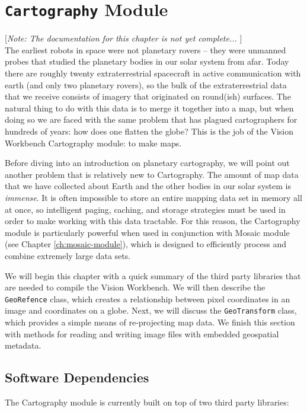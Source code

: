 \chapter{{\tt Cartography} Module}\label{ch:cartography-module}

[{\em Note: The documentation for this chapter is not yet complete... }]
$$
$$ 
The earliest robots in space were not planetary rovers -- they were
unmanned probes that studied the planetary bodies in our solar system
from afar.  Today there are roughly twenty extraterrestrial spacecraft
in active communication with earth (and only two planetary rovers), so
the bulk of the extraterrestrial data that we receive consists of
imagery that originated on round(ish) surfaces.  The natural thing to
do with this data is to merge it together into a map, but when doing
so we are faced with the same problem that has plagued cartographers
for hundreds of years: how does one flatten the globe?  This is the job
of the Vision Workbench Cartography module: to make maps.

Before diving into an introduction on planetary cartography, we will
point out another problem that is relatively new to Cartography.  The
amount of map data that we have collected about Earth and the other
bodies in our solar system is {\em immense}.  It is often impossible
to store an entire mapping data set in memory all at once, so
intelligent paging, caching, and storage strategies must be used in
order to make working with this data tractable.  For this reason, the
Cartography module is particularly powerful when used in conjunction
with Mosaic module (see Chapter \ref{ch:mosaic-module}), which is
designed to efficiently process and combine extremely large data sets.

We will begin this chapter with a quick summary of the third party
libraries that are needed to compile the Vision Workbench.  We will
then describe the \verb#GeoRefence# class, which creates a
relationship between pixel coordinates in an image and coordinates on
a globe.  Next, we will discuss the \verb#GeoTransform# class, which
provides a simple means of re-projecting map data.  We finish this
section with methods for reading and writing image files with embedded
geospatial metadata.

\section{Software Dependencies}

The Cartography module is currently built on top of two third party
libraries:

